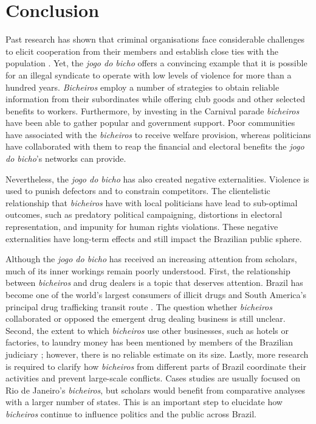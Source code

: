 \section{Conclusion}
\label{sec:conclusion}

Past research has shown that criminal organisations face considerable challenges to elicit cooperation from their members and establish close ties with the population \citep[e.g.][]{gambetta1996sicilian,skarbek2011governance,skarbek2012prison,varese2001russian,varese2011mafias}. Yet, the \emph{jogo do bicho} offers a convincing example that it is possible for an illegal syndicate to operate with low levels of violence for more than a hundred years. \emph{Bicheiros} employ a number of strategies to obtain reliable information from their subordinates while offering club goods and other selected benefits to workers. Furthermore, by investing in the Carnival parade \emph{bicheiros} have been able to gather popular and government support. Poor communities have associated with the \emph{bicheiros} to receive welfare provision, whereas politicians have collaborated with them to reap the financial and electoral benefits the \emph{jogo do bicho}'s networks can provide.

Nevertheless, the \emph{jogo do bicho} has also created negative externalities. Violence is used to punish defectors and to constrain competitors. The clientelistic relationship that \emph{bicheiros} have with local politicians have lead to sub-optimal outcomes, such as predatory political campaigning, distortions in electoral representation, and impunity for human rights violations. These negative externalities have long-term effects and still impact the Brazilian public sphere.

Although the \emph{jogo do bicho} has received an increasing attention from scholars, much of its inner workings remain poorly understood. First, the relationship between \emph{bicheiros} and drug dealers is a topic that deserves attention. Brazil has become one of the world's largest consumers of illicit drugs and South America's principal drug trafficking transit route \citep{miraglia2015drugs,misse2011crime}. The question whether \emph{bicheiros} collaborated or opposed the emergent drug dealing business is still unclear. Second, the extent to which \emph{bicheiros} use other businesses, such as hotels or factories, to laundry money has been mentioned by members of the Brazilian judiciary \citep{globo2012bicheiro,globo2015cacaniquel}; however, there is no reliable estimate on its size. Lastly, more research is required to clarify how \emph{bicheiros} from different parts of Brazil coordinate their activities and prevent large-scale conflicts. Cases studies are usually focused on Rio de Janeiro's \emph{bicheiros}, but scholars would benefit from comparative analyses with a larger number of states. This is an important step to elucidate how \emph{bicheiros} continue to influence politics and the public across Brazil.


